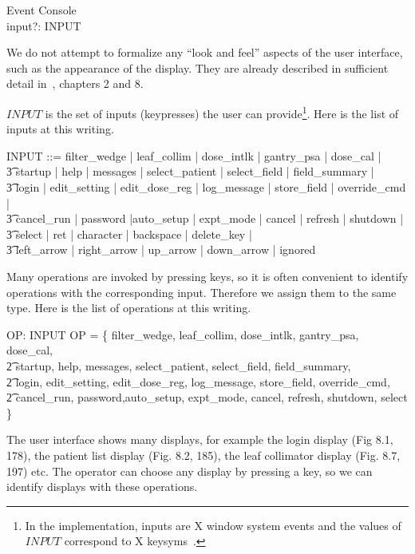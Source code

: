 \begin{schema}{Event}
	\Delta Console \\
	input?: INPUT
\end{schema}
We do not attempt to formalize any ``look and feel'' aspects of the
user interface, such as the appearance of the display.  They are
already described in sufficient detail in~\cite{jacky92}, chapters 2
and 8.

$INPUT$ is the set of inputs (keypresses) the user can
provide\footnote{In the implementation, inputs are X window system
events and the values of $INPUT$ correspond to X
keysyms~\cite{nye88}.}.  Here is the list of inputs at this writing.

\begin{zed} 
INPUT ::= filter\_wedge | leaf\_collim | dose\_intlk | gantry\_psa | dose\_cal | \\
\t3	startup | help | messages | select\_patient | select\_field | field\_summary | \\
\t3	login | edit\_setting | edit\_dose\_reg | log\_message | store\_field | override\_cmd | \\
\t3	cancel\_run | password |auto\_setup | expt\_mode | cancel | refresh | shutdown | \\
\t3	 select | ret | character | backspace | delete\_key | \\ 
\t3	left\_arrow | right\_arrow | up\_arrow | down\_arrow | ignored
\end{zed}
Many operations are invoked by pressing keys, so it is often
convenient to identify operations with the corresponding input.
Therefore we assign them to the same type.   Here is the list of 
operations at this writing.

\begin{axdef}
	OP: \power INPUT
\where
OP = \{ filter\_wedge, leaf\_collim, dose\_intlk, gantry\_psa, dose\_cal, \\
\t2 startup, help, messages, select\_patient, select\_field, field\_summary, \\
\t2 login, edit\_setting, edit\_dose\_reg, log\_message, store\_field, override\_cmd, \\
\t2 cancel\_run, password,auto\_setup, expt\_mode, cancel, refresh, shutdown, select \}
\end{axdef}
The user interface shows many displays, for example the login display
(Fig 8.1, 178), the patient list display (Fig. 8.2, 185), the leaf
collimator display (Fig. 8.7, 197) etc.  The operator can choose any
display by pressing a key, so we can identify displays with these
operations.

